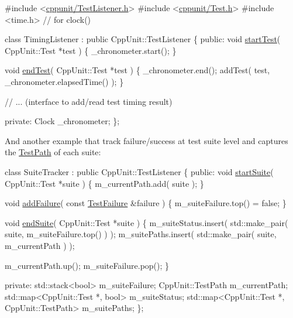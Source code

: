 \begin{DoxyCode}
\textcolor{preprocessor}{#include <\hyperlink{_test_listener_8h}{cppunit/TestListener.h}>}
\textcolor{preprocessor}{#include <\hyperlink{_test_8h}{cppunit/Test.h}>}
\textcolor{preprocessor}{#include <time.h>}    \textcolor{comment}{// for clock()}

\textcolor{keyword}{class }TimingListener : \textcolor{keyword}{public} CppUnit::TestListener
\{
\textcolor{keyword}{public}:
  \textcolor{keywordtype}{void} \hyperlink{class_test_listener_a5546d4420e7412234915113b1ea5ad77}{startTest}( CppUnit::Test *test )
  \{
    \_chronometer.start();
  \}
 
  \textcolor{keywordtype}{void} \hyperlink{class_test_listener_ae8ccd0f55dd9aa7eafded05ba14f9ac6}{endTest}( CppUnit::Test *test )
  \{
    \_chronometer.end();
    addTest( test, \_chronometer.elapsedTime() );
  \}

  \textcolor{comment}{// ... (interface to add/read test timing result)}

\textcolor{keyword}{private}:
  Clock \_chronometer;
\};
\end{DoxyCode}


And another example that track failure/success at test suite level and captures the \hyperlink{class_test_path}{Test\-Path} of each suite\-: 
\begin{DoxyCode}
\textcolor{keyword}{class }SuiteTracker : \textcolor{keyword}{public} CppUnit::TestListener
\{
\textcolor{keyword}{public}:
  \textcolor{keywordtype}{void} \hyperlink{class_test_listener_a2360ebfccfa39f75bdc43948d5d1d2e7}{startSuite}( CppUnit::Test *suite )
  \{
    m\_currentPath.add( suite );
  \}
  
  \textcolor{keywordtype}{void} \hyperlink{class_test_listener_a103216a5814c907f7b752b969477e765}{addFailure}( \textcolor{keyword}{const} \hyperlink{class_test_failure}{TestFailure} &failure )
  \{
    m\_suiteFailure.top() = \textcolor{keyword}{false};
  \}

  \textcolor{keywordtype}{void} \hyperlink{class_test_listener_ad49e5589681732a1faff8fca5cbe61f5}{endSuite}( CppUnit::Test *suite )
  \{
    m\_suiteStatus.insert( std::make\_pair( suite, m\_suiteFailure.top() ) );
    m\_suitePaths.insert( std::make\_pair( suite, m\_currentPath ) );

    m\_currentPath.up();
    m\_suiteFailure.pop();
  \}

\textcolor{keyword}{private}:
  std::stack<bool> m\_suiteFailure;
  CppUnit::TestPath m\_currentPath;
  std::map<CppUnit::Test *, bool> m\_suiteStatus;
  std::map<CppUnit::Test *, CppUnit::TestPath> m\_suitePaths;
\};
\end{DoxyCode}


